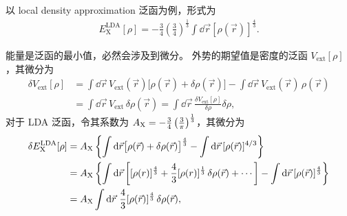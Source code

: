 以 local density approximation 泛函为例，形式为
\begin{align}
E_{\text{X}}^{\text{LDA}}[\rho] = -\frac34 \left(\frac34\right)^{\frac13} \int\dd\vec r [\rho(\vec r)]^{\frac43}.
\end{align}

能量是泛函的最小值，必然会涉及到微分。
外势的期望值是密度的泛函 $V_{\text{ext}}[\rho]$，其微分为
\begin{align}
\delta V_{\text{ext}}[\rho] 
&= \int \dd \vec r \, V_{\text{ext}}(\vec r) 
\bigl[
    \rho(\vec r) + \delta\rho(\vec r)
\bigr] - 
\int \dd \vec r \, V_{\text{ext}}(\vec r)\, \rho(\vec r) \\
&= \int \dd \vec r \, V_{\text{ext}} \, \delta \rho(\vec r) 
= \int \dd\vec r\, \frac{\delta V_{\text{ext}}[\rho]}{\delta\rho} \delta\rho, 
\end{align}
对于 LDA 泛函，令其系数为 $A_{\text X} = - \frac34\left(\frac3\pi\right)^{\frac13}$，其微分为
\begin{align}
\delta E_{\text{X}}^{\text{LDA}}[\rho] 
&= A_{\text X} \left\{
    \int \mathrm{d}\vec r \bigl[
        \rho(\vec r) + \delta \rho(\vec r)
    \bigr]^{\frac43} - \int \mathrm{d}\vec r\, [\rho(\vec r)]^{4/3}
\right\} \notag\\
& = A_{\text X} \left\{
    \int \mathrm{d}\vec r\left[
        [\rho(r)]^{\frac43} + \frac43 [\rho(r)]^{\frac13} \,\delta \rho(\vec r) + \cdots
    \right] - \int \mathrm{d}\vec r\, [\rho(\vec r)]^{\frac43}
\right\} \notag\\
&= A_{\text X} \int\mathrm{d}\vec r \ \frac43 [\rho(\vec r)]^{\frac43} \,\delta \rho(\vec r),
\end{align}
